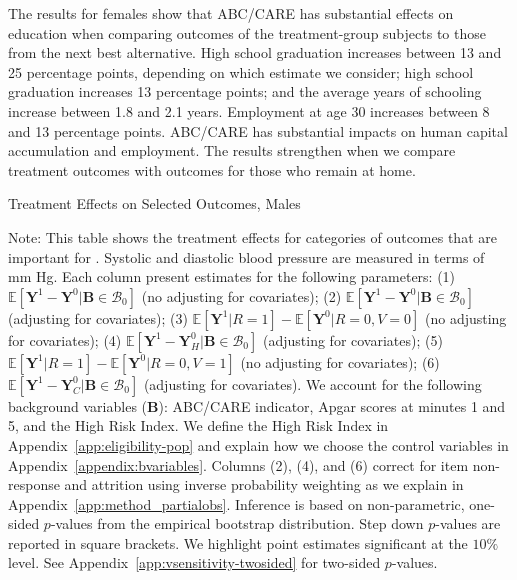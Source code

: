 The results for females show that ABC/CARE has substantial effects on education when comparing outcomes of the treatment-group subjects to those from the next best alternative. High school graduation increases between 13 and 25 percentage points, depending on which estimate we consider; high school graduation increases 13 percentage points; and the average years of schooling increase between 1.8 and 2.1 years. Employment at age 30 increases between 8 and 13 percentage points. ABC/CARE has substantial impacts on human capital accumulation and employment. The results strengthen when we compare treatment outcomes with outcomes for those who remain at home.

\begin{table}
\centering
\begin{threeparttable}
\caption{Treatment Effects on Selected Outcomes, Males}\label{table:tescombinedmales}
\begin{scriptsize}

\end{scriptsize}
\begin{tablenotes}
\scriptsize
Note: This table shows the treatment effects for categories of outcomes that are important for \citet{Garcia_Heckman_Leaf_etal_2017_Comp_CBA_Unpublished}. Systolic and diastolic blood pressure are measured in terms of mm Hg. Each column present estimates for the following parameters: (1) $\mathbb{E} \left [ \bm{Y}^1 -  \bm{Y}^0 | \bm{B} \in \mathcal{B}_{0} \right]$ (no adjusting for covariates); (2) $\mathbb{E} \left [ \bm{Y}^1 -  \bm{Y}^0 | \bm{B} \in \mathcal{B}_{0} \right]$ (adjusting for covariates); (3) $\mathbb{E} \left [ \bm{Y}^1 | R = 1 \right] -  \mathbb{E} \left [ \bm{Y}^0 | R = 0,V = 0  \right]$ (no adjusting for covariates); (4) $\mathbb{E} \left [ \bm{Y}^1 -  \bm{Y}_H^0 | \bm{B} \in \mathcal{B}_{0} \right]$ (adjusting for covariates); (5) $\mathbb{E} \left [ \bm{Y}^1 | R = 1 \right] -  \mathbb{E} \left [ \bm{Y}^0 | R = 0,V = 1 \right]$ (no adjusting for covariates); (6) $\mathbb{E} \left [ \bm{Y}^1 -  \bm{Y}_C^0 | \bm{B} \in \mathcal{B}_{0} \right]$ (adjusting for covariates). We account for the following background variables ($\bm{B}$): ABC/CARE indicator, Apgar scores at minutes 1 and 5, and the High Risk Index. We define the High Risk Index in Appendix~\ref{app:eligibility-pop} and explain how we choose the control variables in Appendix~\ref{appendix:bvariables}. Columns (2), (4), and (6) correct for item non-response and attrition using inverse probability weighting as we explain in Appendix~\ref{app:method_partialobs}. Inference is based on non-parametric, one-sided $p$-values from the empirical bootstrap distribution. Step down $p$-values are reported in square brackets. We highlight point estimates significant at the $10\%$ level. See Appendix~\ref{app:vsensitivity-twosided} for two-sided $p$-values.\\
\end{tablenotes}
\end{threeparttable}
\end{table}
\doublespacing

